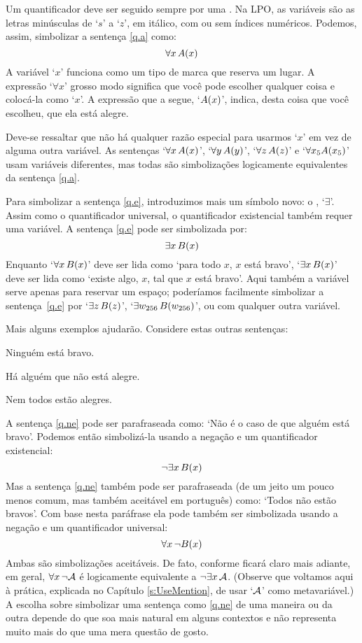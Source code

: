 Um quantificador deve ser seguido sempre por uma .
Na LPO, as variáveis são as letras minúsculas de `$s$' a `$z$', em itálico, com ou sem índices numéricos.
Podemos, assim, simbolizar a sentença \ref{q.a} como:
$$\forall x\, \mathord{A}(x)$$
A variável `$x$' funciona como um tipo de marca que reserva um lugar.
A expressão `$\forall x$' grosso modo significa que você pode escolher qualquer coisa e colocá-la como `$x$'.
A expressão que a segue, `$\mathord{A}(x)$', indica, desta coisa que você escolheu,  que ela está alegre.

Deve-se ressaltar que não há qualquer razão especial para usarmos `$x$' em vez de alguma outra variável.
As sentenças `$\forall x\, \mathord{A}(x)$', `$\forall y\, \mathord{A}(y)$', `$\forall z\, \mathord{A}(z)$' e `$\forall x_5 \mathord{A}(x_5)$' usam variáveis diferentes, mas todas são simbolizações logicamente equivalentes da sentença \ref{q.a}.

Para simbolizar a sentença \ref{q.e}, introduzimos mais um símbolo novo: o , `$\exists$'.
Assim como o quantificador universal, o quantificador existencial também requer uma variável.
A sentença \ref{q.e} pode ser simbolizada por:
$$\exists x\,\mathord{B}(x)$$
Enquanto `$\forall x\,\mathord{B}(x)$' deve ser lida como `para todo $x$, $x$ está bravo', `$\exists x\,\mathord{B}(x)$' deve ser lida como `existe algo, $x$, tal que $x$ está bravo'.
Aqui também a variável serve apenas para reservar um espaço; poderíamos facilmente simbolizar a sentença~\ref{q.e} por `$\exists z\, \mathord{B}(z)$', `$\exists w_{256}\, \mathord{B}(w_{256})$', ou com qualquer outra variável.


Mais alguns exemplos ajudarão. Considere estas outras sentenças:
	\begin{earg}
		\item[\ex{q.ne}] Ninguém está bravo.
		\item[\ex{q.en}] Há alguém que não está alegre.
		\item[\ex{q.na}] Nem todos estão alegres.
	\end{earg}
A sentença \ref{q.ne} pode ser parafraseada como:
`Não é o caso de que alguém está bravo'.
Podemos então simbolizá-la usando a negação e um quantificador existencial:
$$\neg \exists x\,\mathord{B}(x)$$
Mas a sentença \ref{q.ne} também pode ser parafraseada (de um jeito um pouco menos comum, mas também aceitável em português) como:
`Todos não estão bravos'.
Com base nesta paráfrase ela pode também ser simbolizada usando a negação e um quantificador universal:
$$\forall x\, \neg \mathord{B}(x)$$
Ambas são simbolizações aceitáveis.
De fato, conforme ficará claro mais adiante, em geral, $\forall x\, \neg\mathcal{A}$ é logicamente equivalente a $\neg\exists x\,\mathcal{A}$.
(Observe que voltamos aqui à prática, explicada no Capítulo \ref{s:UseMention}, de usar `$\mathcal{A}$' como metavariável.)
A escolha sobre simbolizar uma sentença como \ref{q.ne} de uma maneira ou da outra depende do que soa mais natural em alguns contextos e  não representa muito mais do que uma mera questão de gosto.

